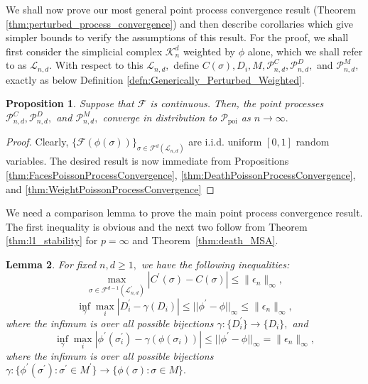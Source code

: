 \documentclass[12pt]{amsart}
\newcommand{\PoiP}{\mathscr{P}_{\text{poi}}}
\newcommand{\PoiF}{\mathscr{P}_{n, d}^{C}}
\newcommand{\PoiD}{\mathscr{P}_{n, d}^{D}}
\newcommand{\PoiM}{\mathscr{P}_{n, d}^{M}}
\newcommand{\PoiFt}{\mathscr{P}_{n, d}^{C^\prime}}
\newcommand{\PoiMt}{\mathscr{P}_{n, d}^{M^\prime}}
\newcommand{\PoiDt}{\mathscr{P}_{n, d}^{D^\prime}}
\newcommand{\gt}[1]{\textcolor{blue}{#1}}
\newcommand{\remove}[1]{}
\renewcommand{\gt}[1]{#1}
\newtheorem{theorem}{Theorem}[section]
\newtheorem{lemma}[theorem]{Lemma}
\newtheorem{prop}[theorem]{Proposition}
\numberwithin{equation}{section}
\numberwithin{theorem}{section}
\newcommand{\1}{\mathbf{1}}
\def\F{\mathcal{F}}
\def\sF{\mathscr{F}}
\def\cL{\mathcal{L}}
\def\Lp{\mathcal{L}^\prime}
\def\Dp{D^\prime}
\def\Mp{M^\prime}
\def\K{\mathcal{K}}
\def\phip{\phi^\prime}
\begin{document}
We shall now prove our most general point process convergence result (Theorem \ref{thm:perturbed_process_convergence}) and then describe corollaries which give simpler bounds to verify the assumptions of this result. For the proof, we shall first consider the simplicial complex $\K_{n}^{d}$ weighted by $\phi$ alone, which we shall refer to as $\cL_{n, d}$. With respect to this $\cL_{n, d},$ define $C(\sigma), D_i, M, \PoiF, \PoiD,$ and $\PoiM,$ exactly as below Definition \ref{defn:Generically_Perturbed_Weighted}. 
%
%	
\begin{prop}
\label{thm:All_PP_Converge}
Suppose that $\sF$ is \gt{continuous}. Then, the point processes $\PoiF, \PoiD,$ and $\PoiM,$ converge in distribution to $\PoiP$ as $n \to \infty.$
\end{prop}
\begin{proof}
Clearly, $\{\sF(\phi(\sigma))\}_{\sigma \in \F^{d}(\cL_{n, d})}$ are i.i.d. uniform $[0,1]$ random variables. The desired result is now immediate from Propositions \ref{thm:FacesPoissonProcessConvergence}, \ref{thm:DeathPoissonProcessConvergence}, and \ref{thm:WeightPoissonProcessConvergence}
\end{proof}
%	
\remove{
\begin{theorem}
\label{thm:perturbed_process_convergence}
Suppose that $\sF$ is Lipschitz continuous and strictly increasing. If $n \|\epsilon_n\|_{\infty} \to 0$ in probability, then each of $\PoiFt, \PoiDt,$ and $\PoiMt$ converges in distribution to $\PoiP.$
\end{theorem}
%
}
We need a comparison lemma to prove the main point process convergence result. The first inequality is obvious and the next two follow from Theorem \ref{thm:l1_stability} for $p = \infty$ and Theorem~\ref{thm:death_MSA}.
%	
\begin{lemma}
\label{lem:max_C_Perturbation}
For fixed $n, d \geq 1,$ we have the following inequalities:
\[
\max_{\sigma \in \F^{d - 1}(\Lp_{n, d})} |C^\prime(\sigma) - C(\sigma)| \leq \|\epsilon_n\|_{\infty},
\]
%
\[
\inf_{\gamma} \max_{i} |\Dp_{i} - \gamma(D_{i})| \leq ||\phip - \phi||_{\infty} \leq \|\epsilon_n\|_{\infty} ,
\]
where the infimum is over all possible bijections $\gamma : \{\Dp_i\} \to \{D_i\},$ and
%
\[		\inf_{\gamma} \max_{i} |\phip(\sigma^\prime_i) - \gamma(\phi(\sigma_i))| \leq ||\phip - \phi||_{\infty} = \|\epsilon_n\|_{\infty},
\]
where the infimum is over all possible bijections $\gamma: \{\phip(\sigma^\prime) : \sigma^\prime \in \Mp\} \to \{\phi(\sigma) : \sigma \in M\}.$
%
\end{lemma}
\end{document}
